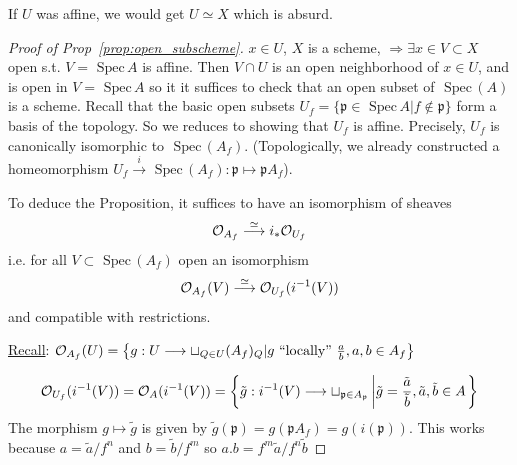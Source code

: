 \documentclass[11pt]{article}
\newcommand{\spec}{\text{ Spec}\,}
\newcommand{\scp}{{\mathfrak p}}
\newcommand{\calo}{{\cal O}}
\newcommand{\Lrta}{\Longrightarrow}
\newcommand{\lrta}{\longrightarrow}
\begin{document}
If $U$ was affine, we would get $U\simeq X$ which is absurd.
\begin{proof}[Proof of Prop~\ref{prop:open_subscheme}]
$x\in U$, $X$ is a scheme, $\Lrta \exists x\in V\subset X$ open s.t. $V=\spec A$ is affine. Then $V\cap U$ is an open neighborhood of $x\in U$, and is  open in $V=\spec A$ so it it suffices to check that an open subset of $\spec(A)$ is a scheme. Recall that the basic open subsets $U_f=\{\scp\in \spec A|f\notin \scp\}$ form a basis of the topology. So we reduces to showing that  $U_f$ is affine. Precisely, $U_f$ is canonically isomorphic to $\spec(A_f)$. (Topologically, we already constructed a homeomorphism $U_f\overset{i}{\lrta} \spec(A_f): \scp\mapsto \scp A_f$).

To deduce the Proposition, it suffices to have an isomorphism of sheaves 
$$
\calo_{A_f}\overset{\simeq}{\lrta} i_*\calo_{U_f}
$$
i.e. for all $V\subset \spec (A_f)$ open an isomorphism 
$$
\calo_{A_f}(V)\overset{\simeq }{\lrta} \calo_{U_f}(i^{-1}(V))
$$
and compatible with restrictions.

\underline{Recall}: $\calo_{A_f}(U)=\left\{g:U\lrta \sqcup_{Q\in U}(A_f)_Q|g\text{ ``locally'' } \frac{a}{b}, a,b\in A_f\right\} $

$$
\calo_{U_f}(i^{-1}(V))=\calo_A(i^{-1}(V))=\left\{\tilde{g}: i^{-1}(V)\lrta \sqcup_{\scp \in A_{\scp}}\left|\tilde{g}=\frac{\tilde{a}}{\tilde{b}}, \tilde{a},\tilde{b}\in A\right.\right\}
$$
The morphism $g\mapsto \tilde{g}$ is given by $\tilde{g}(\scp)=g(\scp A_f)=g(i(\scp))$. This works because $a=\tilde{a}/f^n$ and $b=\tilde{b}/f^m$ so $a.b=f^m\tilde{a}/f^n\tilde{b}$
\end{proof}
\end{document}
